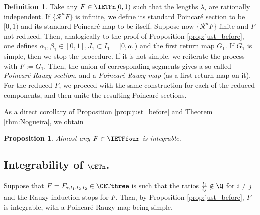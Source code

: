 \documentclass[12pt]{article}
\newtheorem{proposition}{Proposition}
\theoremstyle{definition}
\newtheorem{definition}{Definition}
\begin{document}
\begin{definition}
Take any $F \in \IETFn[0,1)$ such that the lengths $\lambda_i$ are rationally independent. If $\{ \mathcal{R}^n F\}$ is infinite, we define its standard Poincaré section to be $[0,1)$ and its standard Poincaré map to be itself. Suppose now $\{ \mathcal{R}^n F\}$ finite and $F$ not reduced. Then, analogically to the proof of Proposition \ref{prop:just_before}, one defines $\alpha_1, \beta_1 \in [0,1], J_1 \subset I_1=[0, \alpha_1)$ and the first return map $G_1$. If $G_1$ is simple, then we stop the procedure. If it is not simple, we reiterate the process with $F:=G_1$. Then, the union of corresponding segments gives a so-called \emph{Poincaré-Rauzy section}, and a \emph{Poincaré-Rauzy map} (as a first-return map on it). For the reduced $F$, we proceed with the same construction for each of the reduced components, and then unite the resulting Poincaré sections.
%
%
%
%
%
%
 \end{definition}
 
 
 As a direct corollary of Proposition \ref{prop:just_before} and Theorem \ref{thm:Nogueira}, we obtain
\begin{proposition}\label{thm:IETfour}
Almost any $F \in \IETFfour$ is integrable.
\end{proposition}

\subsection{Integrability of $\CETn$.}

Suppose that $F=F_{\tau, l_1, l_2, l_2}  \in \CETthree$ is such that the ratios $\frac{l_i}{l_j} \notin \Q$ for $i \neq j$ and the Rauzy induction stops for $F$. Then, by Proposition \ref{prop:just_before}, $F$ is integrable, with a Poincaré-Rauzy map being simple.
\end{document}
